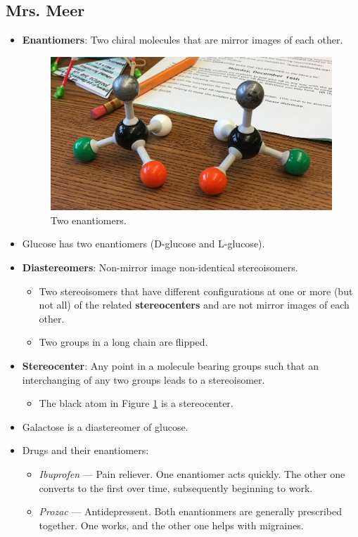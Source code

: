 \documentclass[titlepage]{article}
\numberwithin{figure}{section}
\numberwithin{table}{section}
\numberwithin{equation}{section}
\begin{document}
\subsection{Mrs. Meer}
\begin{itemize}
    \item \textbf{Enantiomers}: Two chiral molecules that are mirror images of each other.
    \begin{figure}[H]
        \centering
        \includegraphics[width=0.4\linewidth]{Blender/enantiomers.jpg}
        \caption{Two enantiomers.}
        \label{fig:enantiomers}
    \end{figure}
    \item Glucose has two enantiomers (D-glucose and L-glucose).
    \item \textbf{Diastereomers}: Non-mirror image non-identical stereoisomers.
    \begin{itemize}
        \item Two stereoisomers that have different configurations at one or more (but not all) of the related \textbf{stereocenters} and are not mirror images of each other.
        \item Two groups in a long chain are flipped.
    \end{itemize}
    \item \textbf{Stereocenter}: Any point in a molecule bearing groups such that an interchanging of any two groups leads to a stereoisomer.
    \begin{itemize}
        \item The black atom in Figure \ref{fig:enantiomers} is a stereocenter.
    \end{itemize}
    \item Galactose is a diastereomer of glucose.
    \item Drugs and their enantiomers:
    \begin{itemize}
        \item \textit{Ibuprofen} --- Pain reliever. One enantiomer acts quickly. The other one converts to the first over time, subsequently beginning to work.
        \item \textit{Prozac} --- Antidepressent. Both enantionmers are generally prescribed together. One works, and the other one helps with migraines.

\end{itemize}
\end{itemize}
\end{document}
